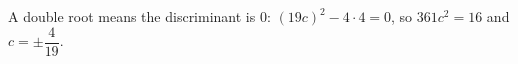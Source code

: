 A double root means the discriminant is $0$: $(19c)^2-4\cdot4=0$, so $361c^2=16$ and $c=\boxed{\pm\dfrac{4}{19}}$.
